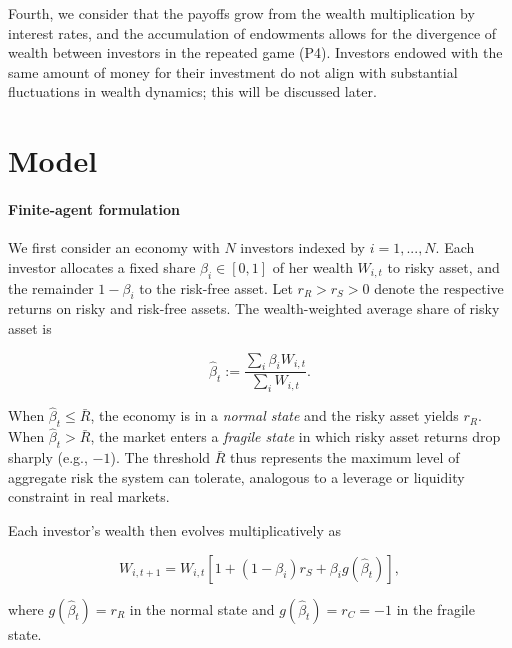 \documentclass[11pt,a4paper]{article}
\begin{document}
Fourth, we consider that the payoffs grow from the wealth multiplication by interest rates, and the accumulation of endowments allows for the divergence of wealth between investors in the repeated game (P4). Investors endowed with the same amount of money for their investment do not align with substantial fluctuations in wealth dynamics; this will be discussed later.

\bigskip 
\section{Model}

\paragraph{Finite-agent formulation} We first consider an economy with $N$ investors indexed by $i=1,...,N$. Each investor allocates a fixed share $\beta_i \in [0,1]$ of her wealth $W_{i,t}$ to risky asset, and the remainder $1-\beta_i$ to the risk-free asset. Let $r_R>r_S>0$ denote the respective returns on risky and risk-free assets. The wealth-weighted average share of risky asset is

\begin{equation}
	\label{eq:definitionHatBeta}
	\hat\beta_t := \frac{\sum_i \beta_{i}W_{i,t}}{\sum_i W_{i,t}}.
\end{equation}

When $\hat\beta_t \le \bar R$, the economy is in a \emph{normal state} and the risky asset yields $r_R$. When $\hat\beta_t > \bar R$, the market enters a \emph{fragile state} in which risky asset returns drop sharply (e.g., $-1$). The threshold $\bar R$ thus represents the maximum level of aggregate risk the system can tolerate, analogous to a leverage or liquidity constraint in real markets. %

Each investor's wealth then evolves multiplicatively as 

\begin{equation}
    \label{eq:wealth_accumulation}
    W_{i,t+1} = W_{i,t}[1+(1-\beta_i)r_S + \beta_i g(\hat\beta_t)],
\end{equation}

where $g(\hat\beta_t)=r_R$ in the normal state and $g(\hat\beta_t)=r_C=-1$ in the fragile state.

\end{document}
